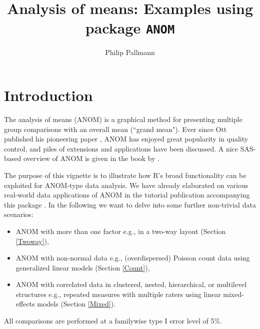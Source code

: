 \documentclass[a4paper]{article}\usepackage[]{graphicx}\usepackage[]{color}
\title{Analysis of means: Examples using package \texttt{ANOM}}
\date{}
\author{Philip Pallmann}
\begin{document}
\maketitle

\tableofcontents


\section{Introduction}

The analysis of means (ANOM) is a graphical method for presenting multiple group comparisons with an overall mean (``grand mean"). Ever since Ott published his pioneering paper \citep{Ott1967}, ANOM has enjoyed great popularity in quality control, and piles of extensions and applications have been discussed. A nice SAS-based overview of ANOM is given in the book by \citet{Nelson2005}.

The purpose of this vignette is to illustrate how R's broad functionality can be exploited for ANOM-type data analysis. We have already elaborated on various real-world data applications of ANOM in the tutorial publication accompanying this package \citep{Pallmann2015}. In the following we want to delve into some further non-trivial data scenarios:
\begin{itemize}
  \item ANOM with more than one factor e.g., in a two-way layout (Section \ref{Twoway}),
  \item ANOM with non-normal data e.g., (overdispersed) Poisson count data using generalized linear models (Section \ref{Count}),
  \item ANOM with correlated data in clustered, nested, hierarchical, or multilevel structures e.g., repeated measures with multiple raters using linear mixed-effects models (Section \ref{Mixed}).
\end{itemize}
All comparisons are performed at a familywise type I error level of 5\%. 



\clearpage

\end{document}
